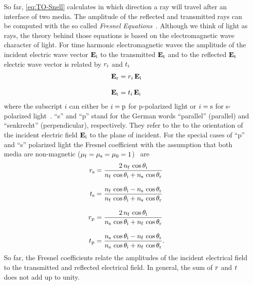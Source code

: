 
So far, \cref{eq:TO-Snell} calculates in which direction a ray will travel 
after an interface of two media. The amplitude of the reflected and transmitted 
rays can be computed with the so called \emph{Fresnel 
Equations}~\cite{Jackson2013,Born1980Ch1}. Although we think of light as rays, 
the theory behind those equations is based on the electromagnetic wave 
character of light. For time harmonic electromagnetic waves the amplitude of 
the incident electric wave vector $\vb{E}_{\mathrm{i}}$ to the transmitted 
$\vb{E}_{\mathrm{t}}$ and to the reflected $\vb{E}_{\mathrm{t}}$ electric wave vector 
is related by $r_{i}$ and $t_{i}$
\begin{subequations}
\begin{align}
  \vb{E}_{\mathrm{r}} & =r_{i}\,\vb{E}_{\mathrm{i}} \\[3mm]
  \vb{E}_{\mathrm{t}} & =t_{i}\,\vb{E}_{\mathrm{i}}
\end{align}
\end{subequations}
where the subscript $i$ can either be $i=\mathrm{p}$ for p-polarized light or 
$i=\mathrm{s}$ for s-polarized light~\cite{Jackson2013,Born1980Ch1}. ``s'' and 
``p'' stand for the German words ``parallel'' (parallel) and ``senkrecht'' 
(perpendicular), respectively. They refer to the to the orientation of the 
incident electric field $\vb{E}_{\mathrm{i}}$ to the plane of incident. For the 
special cases of ``p'' and ``s'' polarized light the Fresnel coefficient with 
the assumption that both media are non-magnetic ($\mu_{\mathrm{f}} = \mu_{\mathrm{s}} = 
\mu_{0} = 1$)~\cite{Born1980Ch1} are
\begin{subequations}
\begin{align}
  r_{\mathrm{s}} & =
  \frac{2\,n_{\mathrm{f}}\,\cos\theta_{\mathrm{i}}}{n_{\mathrm{f}}\,\cos\theta_{\mathrm{i}} + n_{\mathrm{s}}\,\cos\theta_{\mathrm{r}}} 
  \label{eq:TO-fresnel-rs}\\[3mm]
  t_{\mathrm{s}} & = \frac{n_{\mathrm{f}}\,\cos\theta_{\mathrm{i}} - 
  n_{\mathrm{s}}\,\cos\theta_{\mathrm{r}}}{n_{\mathrm{f}}\,\cos\theta_{\mathrm{i}} + n_{\mathrm{s}}\,\cos\theta_{\mathrm{r}}} 
  \label{eq:TO-fresnel-ts}\\[3mm]
  r_{\mathrm{p}} & =
  \frac{2\,n_{\mathrm{f}}\,\cos\theta_{\mathrm{i}}}{n_{\mathrm{s}}\,\cos\theta_{\mathrm{i}} + n_{\mathrm{f}}\,\cos\theta_{\mathrm{r}}} 
  \label{eq:TO-fresnel-rp}\\[3mm]
  t_{\mathrm{p}} & = \frac{n_{\mathrm{s}}\,\cos\theta_{\mathrm{i}} - 
  n_{\mathrm{f}}\,\cos\theta_{\mathrm{r}}}{n_{\mathrm{s}}\,\cos\theta_{\mathrm{i}} + n_{\mathrm{f}}\,\cos\theta_{\mathrm{r}}}.
\label{eq:TO-fresnel-tp}
\end{align}
\end{subequations}
So far, the Fresnel coefficients relate the amplitudes of the incident 
electrical field to the transmitted and reflected electrical field. In general, 
the sum of $r$ and $t$ does not add up to unity.

